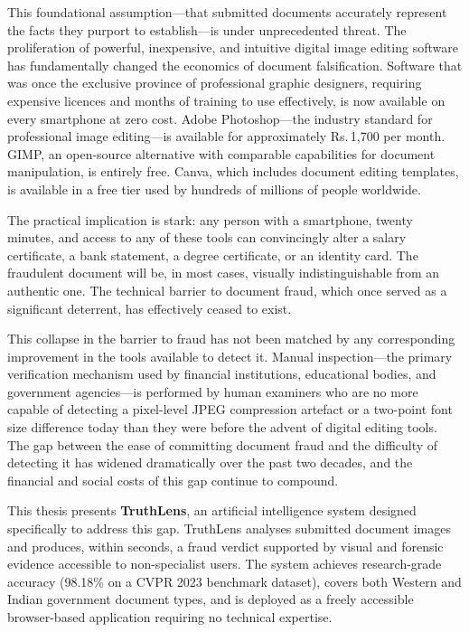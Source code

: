 \documentclass[12pt,a4paper,oneside]{report}
\newcommand{\rupee}{Rs.\,}
\begin{document}
This foundational assumption---that submitted documents accurately represent
the facts they purport to establish---is under unprecedented threat. The
proliferation of powerful, inexpensive, and intuitive digital image editing
software has fundamentally changed the economics of document falsification.
Software that was once the exclusive province of professional graphic
designers, requiring expensive licences and months of training to use
effectively, is now available on every smartphone at zero cost. Adobe
Photoshop---the industry standard for professional image editing---is
available for approximately \rupee 1,700 per month. GIMP, an open-source
alternative with comparable capabilities for document manipulation, is
entirely free. Canva, which includes document editing templates, is
available in a free tier used by hundreds of millions of people worldwide.

The practical implication is stark: any person with a smartphone, twenty
minutes, and access to any of these tools can convincingly alter a salary
certificate, a bank statement, a degree certificate, or an identity card.
The fraudulent document will be, in most cases, visually indistinguishable
from an authentic one. The technical barrier to document fraud, which once
served as a significant deterrent, has effectively ceased to exist.

This collapse in the barrier to fraud has not been matched by any
corresponding improvement in the tools available to detect it. Manual
inspection---the primary verification mechanism used by financial
institutions, educational bodies, and government agencies---is performed
by human examiners who are no more capable of detecting a pixel-level
JPEG compression artefact or a two-point font size difference today than
they were before the advent of digital editing tools. The gap between
the ease of committing document fraud and the difficulty of detecting it
has widened dramatically over the past two decades, and the financial
and social costs of this gap continue to compound.

This thesis presents \textbf{TruthLens}, an artificial intelligence system
designed specifically to address this gap. TruthLens analyses submitted
document images and produces, within seconds, a fraud verdict supported by
visual and forensic evidence accessible to non-specialist users. The system
achieves research-grade accuracy (98.18\% on a CVPR 2023 benchmark dataset),
covers both Western and Indian government document types, and is deployed as
a freely accessible browser-based application requiring no technical expertise.
\end{document}
